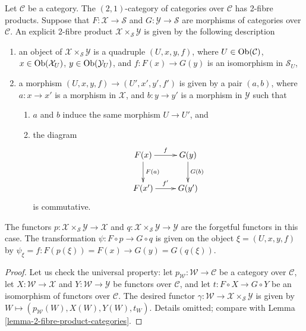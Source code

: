 \begin{lemma}
\label{lemma-2-product-categories-over-C}
Let $\mathcal{C}$ be a category.
The $(2, 1)$-category of categories
over $\mathcal{C}$ has 2-fibre products.
Suppose that
$F : \mathcal{X} \to \mathcal{S}$ and
$G : \mathcal{Y} \to \mathcal{S}$ are morphisms of categories over
$\mathcal{C}$.
An explicit 2-fibre product
$\mathcal{X} \times_\mathcal{S}\mathcal{Y}$ is given by the following
description
\begin{enumerate}
\item an object of $\mathcal{X} \times_\mathcal{S} \mathcal{Y}$ is a quadruple
$(U, x, y, f)$, where $U \in \mathop{\mathrm{Ob}}\nolimits(\mathcal{C})$,
$x\in \mathop{\mathrm{Ob}}\nolimits(\mathcal{X}_U)$, $y\in \mathop{\mathrm{Ob}}\nolimits(\mathcal{Y}_U)$,
and $f : F(x) \to G(y)$ is an isomorphism in $\mathcal{S}_U$,
\item a morphism $(U, x, y, f) \to (U', x', y', f')$ is given by a pair
$(a, b)$, where $a : x \to x'$ is a morphism in $\mathcal{X}$, and
$b : y \to y'$ is a
morphism in $\mathcal{Y}$ such that
\begin{enumerate}
\item $a$ and $b$ induce the same morphism $U \to U'$, and
\item the diagram
$$
\xymatrix{
F(x) \ar[r]^f \ar[d]^{F(a)} & G(y) \ar[d]^{G(b)} \\
F(x') \ar[r]^{f'} & G(y')
}
$$
is commutative.
\end{enumerate}
\end{enumerate}
The functors $p : \mathcal{X} \times_\mathcal{S}\mathcal{Y} \to \mathcal{X}$
and $q : \mathcal{X} \times_\mathcal{S}\mathcal{Y} \to \mathcal{Y}$ are the
forgetful functors in this case. The transformation $\psi : F \circ p \to
G \circ q$ is given on the object $\xi = (U, x, y, f)$ by
$\psi_\xi = f : F(p(\xi)) = F(x) \to G(y) = G(q(\xi))$.
\end{lemma}

\begin{proof}
Let us check the universal property: let
$p_\mathcal{W} : \mathcal{W}\to \mathcal{C}$
be a category over $\mathcal{C}$, let $X : \mathcal{W} \to \mathcal{X}$ and
$Y : \mathcal{W} \to \mathcal{Y}$ be functors over $\mathcal{C}$, and let
$t : F \circ X \to G \circ Y$ be an isomorphism of functors over $\mathcal{C}$.
The desired functor
$\gamma : \mathcal{W} \to \mathcal{X} \times_\mathcal{S} \mathcal{Y}$
is given by $W \mapsto (p_\mathcal{W}(W), X(W), Y(W), t_W)$.
Details omitted; compare with Lemma \ref{lemma-2-fibre-product-categories}.
\end{proof}

